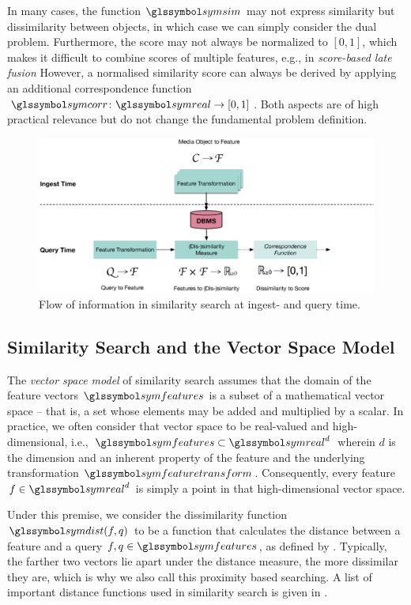 In many cases, the function $\symsim$ may not express similarity but dissimilarity between objects, in which case we can simply consider the dual problem. Furthermore, the score may not always be normalized to $[0, 1]$, which makes it difficult to combine scores of multiple features, e.g., in \emph{score-based late fusion} \cite{Depeursinge:2010Fusion,Rossetto:2018thesis} However, a normalised similarity score can always be derived by applying an additional correspondence function $\symcorr \colon \symreal \rightarrow [0, 1]$. Both aspects are of high practical relevance but do not change the fundamental problem definition. 

\begin{figure}[tb]
    \centering
    \includegraphics[width=\textwidth]{figures/multimedia-retrieval-pipeline}
    \caption{Flow of information in similarity search at ingest- and query time.}
    \label{figure:multimedia_retrieval_flow}
\end{figure}

\subsection{Similarity Search and the Vector Space Model}

The \emph{vector space model} of similarity search assumes that the domain of the feature vectors $\symfeatures$ is a subset of a mathematical vector space -- that is, a set whose elements may be added and multiplied by a scalar. In practice, we often consider that vector space to be real-valued and high-dimensional, i.e., $\symfeatures \subset \symreal^{d}$ wherein $d$ is the dimension and an inherent property of the feature and the underlying transformation $\symfeaturetransform$. Consequently, every feature $f \in \symreal^{d}$ is simply a point in that high-dimensional vector space.

Under this premise, we consider the dissimilarity function $\symdist(f,q)$ to be a function that calculates the distance between a feature and a query $f,q \in \symfeatures$, as defined by . Typically, the farther two vectors lie apart under the distance measure, the more dissimilar they are, which is why we also call this proximity based searching. A list of important distance functions used in similarity search is given in . 

